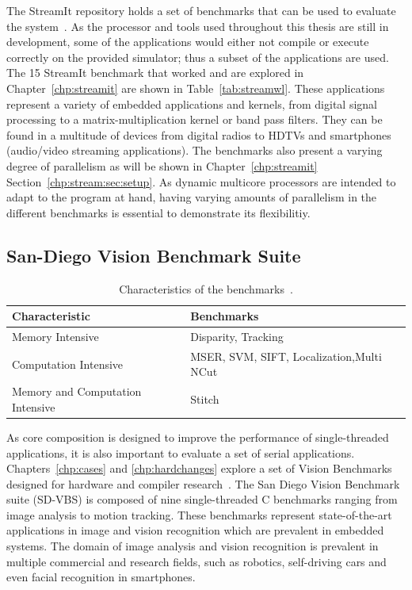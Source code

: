 The StreamIt repository holds a set of benchmarks that can be used to evaluate the system~\cite{streamitrepo}.
As the processor and tools used throughout this thesis are still in development, some of the applications would either not compile or execute correctly on the provided simulator; thus a subset of the applications are used.
The 15 StreamIt benchmark that worked and are explored in Chapter~\ref{chp:streamit} are shown in Table~\ref{tab:streamwl}.
These applications represent a variety of embedded applications and kernels, from digital signal processing to a matrix-multiplication kernel or band pass filters.
They can be found in a multitude of devices from digital radios to HDTVs and smartphones (audio/video streaming applications).
The benchmarks also present a varying degree of parallelism as will be shown in Chapter~\ref{chp:streamit} Section~\ref{chp:stream:sec:setup}.
As dynamic multicore processors are intended to adapt to the program at hand, having varying amounts of parallelism in the different benchmarks is essential to demonstrate its flexibilitiy.

\subsection{San-Diego Vision Benchmark Suite}\label{chp:setup:sdvbs}
\begin{table}[t]
  \smaller
  \centering
 \begin{tabular} { | l | l | }
 \hline
   \cellcolor[gray]{0.7}Characteristic & \cellcolor[gray]{0.7} Benchmarks\\ \hline
    Memory Intensive & Disparity, Tracking\\ \hline
	Computation Intensive & MSER, SVM, SIFT, Localization,Multi NCut\\\hline
	Memory and Computation Intensive & Stitch\\ \hline
   \end{tabular}
  \caption{Characteristics of the benchmarks~\cite{sdvbs}.}\label{tab:sd-vbschar}
\vspace{1em}
  \end{table}
  
As core composition is designed to improve the performance of single-threaded applications, it is also important to evaluate a set of serial applications.
Chapters~\ref{chp:cases} and \ref{chp:hardchanges} explore a set of Vision Benchmarks designed for hardware and compiler research~\cite{sdvbs}.
The San Diego Vision Benchmark suite (SD-VBS) is composed of nine single-threaded C benchmarks ranging from image analysis to motion tracking.
These benchmarks represent state-of-the-art applications in image and vision recognition which are prevalent in embedded systems.
The domain of image analysis and vision recognition is prevalent in multiple commercial and research fields, such as robotics, self-driving cars and even facial recognition in smartphones.

